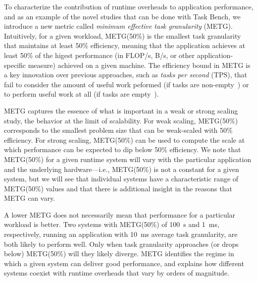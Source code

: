 To characterize the contribution of runtime overheads
to application performance, and as an example of the novel studies that can be done
with Task Bench, we introduce a new metric called
\emph{minimum effective task granularity} (METG). Intuitively, for a given
workload, METG(50\%) is the smallest task granularity that maintains
at least 50\% efficiency, meaning that the application achieves at
least 50\% of the higest performance (in FLOP/s, B/s, or other
application-specific measure) achieved on a given
machine. The efficiency bound in METG is a key innovation over
previous approaches, such as \emph{tasks per second} (TPS), that fail
to consider the amount of useful work peformed (if tasks are
non-empty~\cite{Canary16, Armstrong14}) or to perform useful work at all (if tasks are empty~\cite{LegionTracing18}).

METG captures the essence of what is important in a
weak or strong scaling study, the behavior at the limit of
scalability. For weak scaling, METG(50\%) corresponds to the
smallest problem size that can be weak-scaled with 50\%
efficiency. For strong scaling, METG(50\%) can be used to compute the
scale at which performance can be expected to dip below 50\%
efficiency.  We note that METG(50\%) for a given runtime system will
vary with the particular application and the underlying hardware---i.e., METG(50\%)
is not a constant for a given system, but we will see that individual systems have
a characteristic range of METG(50\%) values and that there is additional insight
in the reasons that METG can vary.

A lower METG does not necessarily mean that
performance for a particular workload is better. Two systems with METG(50\%) of 100~\textmu{}s and 1~ms,
respectively, running an application with 10~ms average task granularity, are both likely to perform well. Only when task
granularity approaches (or drops below) METG(50\%) will they
likely diverge. METG identifies the regime in which a
given system can deliver good performance, and explains how
different systems coexist with runtime overheads that vary by orders of magnitude.

